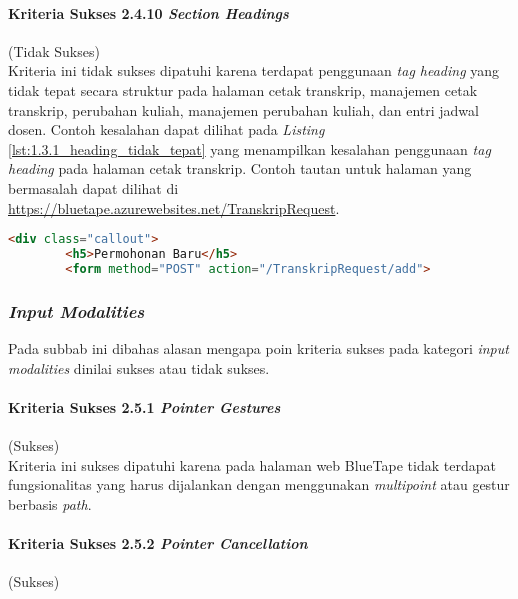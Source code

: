 \paragraph{Kriteria Sukses 2.4.10 \textit{Section Headings}}
\label{par:kepatuhan_bluetape_kriteria_sukses_2.4.10}
(Tidak Sukses)\\

Kriteria ini tidak sukses dipatuhi karena terdapat penggunaan \textit{tag heading} yang tidak tepat secara struktur pada halaman cetak transkrip, manajemen cetak transkrip, perubahan kuliah, manajemen perubahan kuliah, dan entri jadwal dosen. Contoh kesalahan dapat dilihat pada \textit{Listing} \ref{lst:1.3.1_heading_tidak_tepat} yang menampilkan kesalahan penggunaan \textit{tag heading} pada halaman cetak transkrip. Contoh tautan untuk halaman yang bermasalah dapat dilihat di \url{https://bluetape.azurewebsites.net/TranskripRequest}.

\begin{lstlisting}[frame=single, label={lst:2.4.10_heading_tidak_tepat}, language=HTML, caption=Pelanggaran Kriteria Sukses 2.4.10 pada Halaman Cetak Transkrip]
    <div class="callout">
        <h5>Permohonan Baru</h5>
        <form method="POST" action="/TranskripRequest/add">
\end{lstlisting}

\subsubsection{\textit{Input Modalities}}
\label{subsubsec:kepatuhan_bluetape_input_modalities}
Pada subbab ini dibahas alasan mengapa poin kriteria sukses pada kategori \textit{input modalities} dinilai sukses atau tidak sukses.

\paragraph{Kriteria Sukses 2.5.1 \textit{Pointer Gestures}}
\label{par:kepatuhan_bluetape_kriteria_sukses_2.5.1}
(Sukses)\\

Kriteria ini sukses dipatuhi karena pada halaman web BlueTape tidak terdapat fungsionalitas yang harus dijalankan dengan menggunakan \textit{multipoint} atau gestur berbasis \textit{path}.

\paragraph{Kriteria Sukses 2.5.2 \textit{Pointer Cancellation}}
\label{par:kepatuhan_bluetape_kriteria_sukses_2.5.2}
(Sukses)\\

